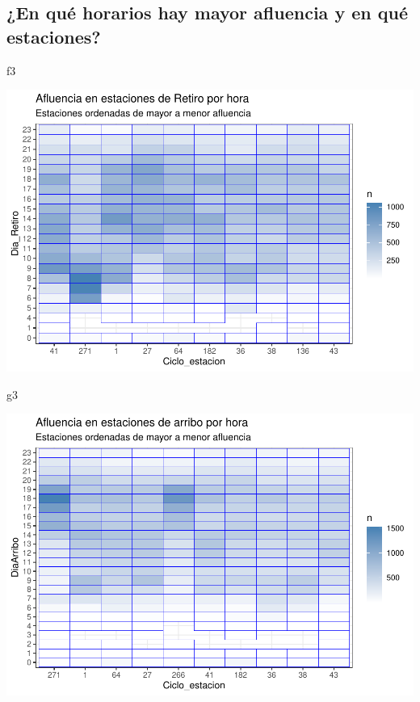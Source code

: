 \documentclass[
]{article}
\newenvironment{Shaded}{\begin{snugshade}}{\end{snugshade}}
\newcommand{\NormalTok}[1]{#1}
\begin{document}
\hypertarget{en-quuxe9-horarios-hay-mayor-afluencia-y-en-quuxe9-estaciones-1}{%
\subsection{¿En qué horarios hay mayor afluencia y en qué
estaciones?}\label{en-quuxe9-horarios-hay-mayor-afluencia-y-en-quuxe9-estaciones-1}}

\begin{Shaded}
\begin{Highlighting}[]
\NormalTok{f3}
\end{Highlighting}
\end{Shaded}

\includegraphics{Ecobici_files/figure-latex/unnamed-chunk-4-1.pdf}

\begin{Shaded}
\begin{Highlighting}[]
\NormalTok{g3}
\end{Highlighting}
\end{Shaded}

\includegraphics{Ecobici_files/figure-latex/unnamed-chunk-5-1.pdf}
\end{document}
